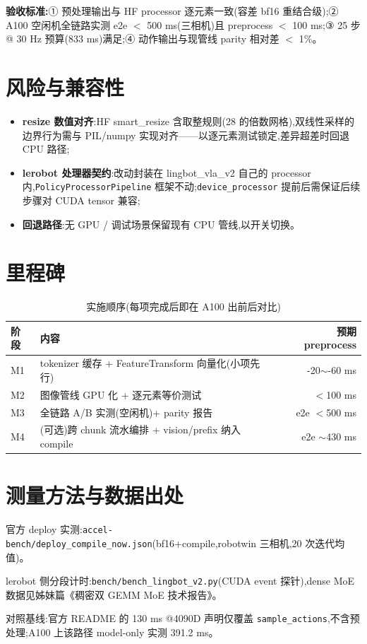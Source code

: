 \documentclass[11pt]{ctexart}
\begin{document}
\textbf{验收标准:}① 预处理输出与 HF processor 逐元素一致(容差 bf16 重结合级);② A100 空闲机全链路实测 e2e $<$ 500 ms(三相机)且 preprocess $<$ 100 ms;③ 25 步 @ 30 Hz 预算(833 ms)满足;④ 动作输出与现管线 parity 相对差 $<$ 1\%。

\section{风险与兼容性}
\begin{itemize}
\item \textbf{resize 数值对齐}:HF smart\_resize 含取整规则(28 的倍数网格),双线性采样的边界行为需与 PIL/numpy 实现对齐——以逐元素测试锁定,差异超差时回退 CPU 路径;
\item \textbf{lerobot 处理器契约}:改动封装在 lingbot\_vla\_v2 自己的 processor 内,\texttt{PolicyProcessorPipeline} 框架不动;\texttt{device\_processor} 提前后需保证后续步骤对 CUDA tensor 兼容;
\item \textbf{回退路径}:无 GPU / 调试场景保留现有 CPU 管线,以开关切换。
\end{itemize}

\section{里程碑}
\begin{table}[htbp]
\centering\small
\caption{实施顺序(每项完成后即在 A100 出前后对比)}
\begin{tabular}{@{}lp{8.6cm}r@{}}
\toprule
阶段 & 内容 & 预期 preprocess \\
\midrule
M1 & tokenizer 缓存 + FeatureTransform 向量化(小项先行) & -20$\sim$-60 ms \\
M2 & 图像管线 GPU 化 + 逐元素等价测试 & $<$100 ms \\
M3 & 全链路 A/B 实测(空闲机)+ parity 报告 & e2e $<$500 ms \\
M4 & (可选)跨 chunk 流水编排 + vision/prefix 纳入 compile & e2e $\sim$430 ms \\
\bottomrule
\end{tabular}
\end{table}

\section*{测量方法与数据出处}
\begin{enumerate}[label={[\arabic*]},leftmargin=2.2em]
\item 官方 deploy 实测:\texttt{accel-bench/deploy\_compile\_now.json}(bf16+compile,robotwin 三相机,20 次迭代均值)。
\item lerobot 侧分段计时:\texttt{bench/bench\_lingbot\_v2.py}(CUDA event 探针),dense MoE 数据见姊妹篇《稠密双 GEMM MoE 技术报告》。
\item 对照基线:官方 README 的 130 ms @4090D 声明仅覆盖 \texttt{sample\_actions},不含预处理;A100 上该路径 model-only 实测 391.2 ms。
\end{enumerate}
\end{document}
